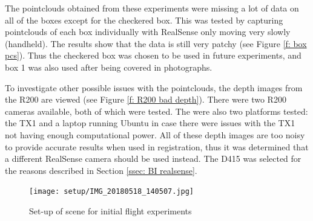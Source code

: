 \documentclass[12pt,a4paper]{article}
\begin{document}
    The pointclouds obtained from these experiments were missing a lot of data on all of the boxes except for the checkered box. This was tested by capturing pointclouds of each box individually with RealSense only moving very slowly (handheld). The results show that the data is still very patchy (see Figure \ref{f: box pcs}). Thus the checkered box was chosen to be used in future experiments, and box 1 was also used after being covered in photographs. 
     
    To investigate other possible issues with the pointclouds, the depth images from the R200 are viewed (see Figure \ref{f: R200 bad depth}). There were two R200 cameras available, both of which were tested. The were also two platforms tested: the TX1 and a laptop running Ubuntu in case there were issues with the TX1 not having enough computational power. All of these depth images are too noisy to provide accurate results when used in registration, thus it was determined that a different RealSense camera should be used instead. The D415 was selected for the reasons described in Section \ref{ssec: BI realsense}.

    \begin{figure}[h]
      \centering
        \texttt{[image: setup/IMG\_20180518\_140507.jpg]}
      \caption{Set-up of scene for initial flight experiments}
      \label{f: initial setup}
    \end{figure}
\end{document}
